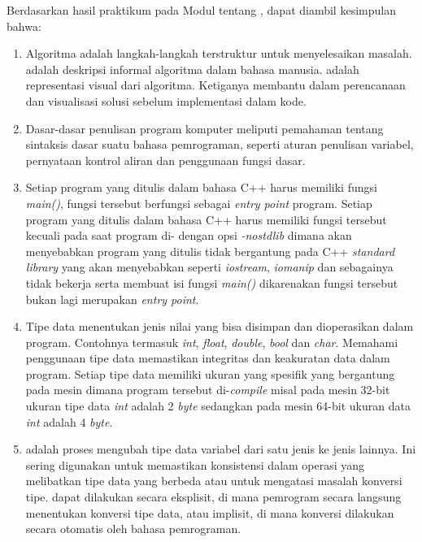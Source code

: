 \documentclass[../main.tex]{subfiles}
\begin{document}
    Berdasarkan hasil praktikum pada Modul {} tentang {\leftmark}, dapat diambil kesimpulan bahwa:
    \begin{enumerate}
        \item {
            Algoritma adalah langkah-langkah terstruktur untuk menyelesaikan masalah. {\Pseudocode} adalah deskripsi informal algoritma dalam bahasa manusia. {\Flowchart} adalah representasi visual dari algoritma. Ketiganya membantu dalam perencanaan dan visualisasi solusi sebelum implementasi dalam kode.
        }
        \item {
            Dasar-dasar penulisan program komputer meliputi pemahaman tentang sintaksis dasar suatu bahasa pemrograman, seperti aturan penulisan variabel, pernyataan kontrol aliran dan penggunaan fungsi dasar.
        }
        \item {
            Setiap program yang ditulis dalam bahasa C++ harus memiliki fungsi \textit{main()}, fungsi tersebut berfungsi sebagai \textit{entry point} program. Setiap program yang ditulis dalam bahasa C++ harus memiliki fungsi tersebut kecuali pada saat program di-{\compile} dengan opsi \textit{-nostdlib} dimana akan menyebabkan program yang ditulis tidak bergantung pada C++ \textit{standard library} yang akan menyebabkan {\header} {\file} seperti \textit{iostream}, \textit{iomanip} dan sebagainya tidak bekerja serta membuat isi fungsi \textit{main()} dikarenakan fungsi tersebut bukan lagi merupakan \textit{entry point}.
        }
        \item {
            Tipe data menentukan jenis nilai yang bisa disimpan dan dioperasikan dalam program. Contohnya termasuk \textit{int}, \textit{float}, \textit{double}, \textit{bool} dan \textit{char}. Memahami penggunaan tipe data memastikan integritas dan keakuratan data dalam program. Setiap tipe data memiliki ukuran yang spesifik yang bergantung pada mesin dimana program tersebut di-\textit{compile} misal pada mesin 32-bit ukuran tipe data \textit{int} adalah 2 \textit{byte} sedangkan pada mesin 64-bit ukuran data \textit{int} adalah 4 \textit{byte}.
        }
        \item {
            {\Typecasting} adalah proses mengubah tipe data variabel dari satu jenis ke jenis lainnya. Ini sering digunakan untuk memastikan konsistensi dalam operasi yang melibatkan tipe data yang berbeda atau untuk mengatasi masalah konversi tipe. {\Typecasting} dapat dilakukan secara eksplisit, di mana pemrogram secara langsung menentukan konversi tipe data, atau implisit, di mana konversi dilakukan secara otomatis oleh bahasa pemrograman.
        }
    \end{enumerate}
\end{document}
